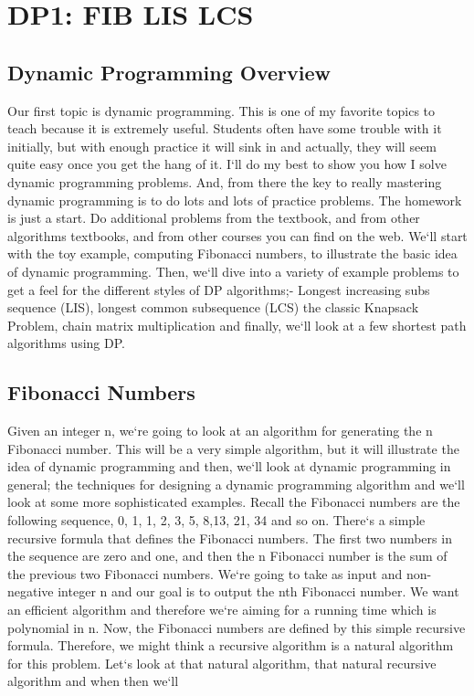 \section{DP1: FIB    LIS    LCS}

\subsection{Dynamic Programming Overview}
Our first topic is dynamic programming.
This is one of my favorite topics to teach because it is extremely useful.
Students often have some trouble with it initially, but with enough practice it will sink in and actually, they will seem quite easy once you get the hang of it.
I`ll do my best to show you how I solve dynamic programming problems.
And, from there the key to really mastering dynamic programming is to do lots and lots of practice problems.
The homework is just a start.
Do additional problems from the textbook, and from other algorithms textbooks, and from other courses you can find on the web.
We`ll start with the toy example, computing Fibonacci numbers, to illustrate the basic idea of dynamic programming.
Then, we`ll dive into a variety of example problems to get a feel for the different styles of DP algorithms;- Longest increasing subs sequence (LIS), longest common subsequence (LCS) the classic Knapsack Problem, chain matrix multiplication and finally, we`ll look at a few shortest path algorithms using DP\@.

\subsection{Fibonacci Numbers}
Given an integer n, we`re going to look at an algorithm for generating the n Fibonacci number.
This will be a very simple algorithm, but it will illustrate the idea of dynamic programming and then, we`ll look at dynamic programming in general; the techniques for designing a dynamic programming algorithm and we`ll look at some more sophisticated examples.
Recall the Fibonacci numbers are the following sequence, 0, 1, 1, 2, 3, 5, 8,13, 21, 34 and so on.
There`s a simple recursive formula that defines the Fibonacci numbers.
The first two numbers in the sequence are zero and one, and then the n Fibonacci number is the sum of the previous two Fibonacci numbers.
We`re going to take as input and non-negative integer n and our goal is to output the nth Fibonacci number.
We want an efficient algorithm and therefore we`re aiming for a running time which is polynomial in n.
Now, the Fibonacci numbers are defined by this simple recursive formula.
Therefore, we might think a recursive algorithm is a natural algorithm for this problem.
Let`s look at that natural algorithm, that natural recursive algorithm and when then we`ll

